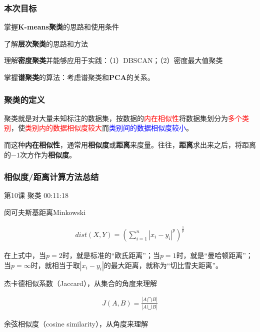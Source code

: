 \documentclass[UTF8]{ctexbook}
\begin{document}
\subsubsection{本次目标}

掌握\textbf{K-means聚类}的思路和使用条件

了解\textbf{层次聚类}的思路和方法

理解\textbf{密度聚类}并能够应用于实践：（1）DBSCAN；（2）密度最大值聚类

掌握\textbf{谱聚类}的算法：考虑谱聚类和\textbf{PCA}的关系。

\subsubsection{聚类的定义}

聚类就是对大量未知标注的数据集，按数据的\textcolor{red}{内在相似性}将数据集划分为\textcolor{red}{多个类别}，使\textcolor{red}{类别内的数据相似度较大}而\textcolor{blue}{类别间的数据相似度较小}。

而这种\textbf{内在相似性}，通常用\textbf{相似度}或\textbf{距离}来度量。往往，\textbf{距离}求出来之后，将距离的$-1$次方作为\textbf{相似度}。

\subsubsection{相似度/距离计算方法总结}

第10课 聚类 00:11:18

闵可夫斯基距离Minkowski

\begin{equation}
\begin{aligned}
dist(X,Y)=\left ( \sum_{i=1}^{n} |x_{i}-y_{i}|^{p} \right )^{\frac{1}{p}}
\end{aligned}
\end{equation}

在上式中，当$p=2$时，就是标准的“欧氏距离”；当$p=1$时，就是“曼哈顿距离”；当$p=\infty$时，就相当于取$|x_{i}-y_{i}|$的最大距离，就称为“切比雪夫距离”。

杰卡德相似系数（Jaccard），从集合的角度来理解

\begin{equation}
\begin{aligned}
J(A,B)=\frac{|A \bigcap B|}{|A \bigcup B|}
\end{aligned}
\end{equation}

余弦相似度（cosine similarity），从角度来理解
\end{document}

